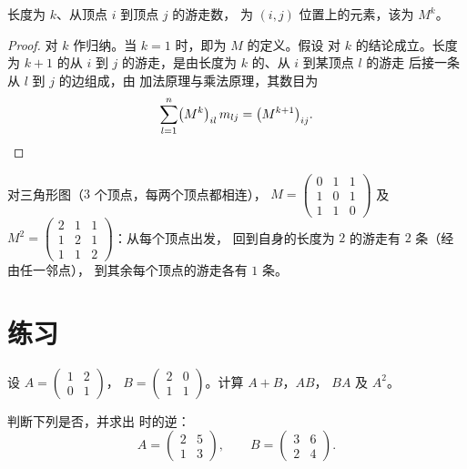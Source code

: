 \begin{theorem}[游走计数]\label{thm:g12:matrix:walks}
长度为 $k$、从顶点 $i$ 到顶点 $j$ 的游走数，
为 $(i,j)$ 位置上的元素，该为 $M^k$。
\end{theorem}

\begin{proof}
对 $k$ 作归纳。当 $k = 1$ 时，即为 $M$ 的定义。假设
对 $k$ 的结论成立。长度为 $k+1$ 的从 $i$ 到 $j$ 的游走，是由长度为 $k$ 的、从 $i$ 到某顶点 $l$ 的游走
后接一条从 $l$ 到 $j$ 的边组成，由
加法原理与乘法原理，其数目为
\[
\sum_{l=1}^{n} \bigl(M^k\bigr)_{il}\, m_{lj} = \bigl(M^{k+1}\bigr)_{ij}.
\qedhere
\]
\end{proof}

\begin{example}
对三角形图（$3$ 个顶点，每两个顶点都相连），
$M = \begin{pmatrix} 0&1&1\\ 1&0&1\\ 1&1&0\end{pmatrix}$ 及
$M^2 = \begin{pmatrix} 2&1&1\\ 1&2&1\\ 1&1&2\end{pmatrix}$：从每个顶点出发，
回到自身的长度为 $2$ 的游走有 $2$ 条（经由任一邻点），
到其余每个顶点的游走各有 $1$ 条。
\end{example}

\section{练习}

\begin{exercise}[$\star$]\label{exo:g12:matrix:1}
设 $A = \begin{pmatrix} 1 & 2\\ 0 & 1 \end{pmatrix}$，
$B = \begin{pmatrix} 2 & 0\\ 1 & 1 \end{pmatrix}$。计算 $A + B$，$AB$，
$BA$ 及 $A^2$。
\end{exercise}

\begin{exercise}[$\star$]\label{exo:g12:matrix:2}
判断下列是否，并求出
时的逆：
\[
A = \begin{pmatrix} 2 & 5\\ 1 & 3\end{pmatrix}, \qquad
B = \begin{pmatrix} 3 & 6\\ 2 & 4\end{pmatrix}.
\]
\end{exercise}

